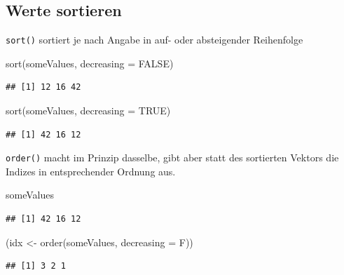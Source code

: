 \documentclass[
]{book}
\newenvironment{Shaded}{\begin{snugshade}}{\end{snugshade}}
\newcommand{\AttributeTok}[1]{\textcolor[rgb]{0.77,0.63,0.00}{#1}}
\newcommand{\ConstantTok}[1]{\textcolor[rgb]{0.00,0.00,0.00}{#1}}
\newcommand{\FunctionTok}[1]{\textcolor[rgb]{0.00,0.00,0.00}{#1}}
\newcommand{\NormalTok}[1]{#1}
\newcommand{\OtherTok}[1]{\textcolor[rgb]{0.56,0.35,0.01}{#1}}
\begin{document}
\hypertarget{werte-sortieren}{%
\subsection{Werte sortieren}\label{werte-sortieren}}

\texttt{sort()} sortiert je nach Angabe in auf- oder absteigender Reihenfolge

\begin{Shaded}
\begin{Highlighting}[]
\FunctionTok{sort}\NormalTok{(someValues, }\AttributeTok{decreasing =} \ConstantTok{FALSE}\NormalTok{)}
\end{Highlighting}
\end{Shaded}

\begin{verbatim}
## [1] 12 16 42
\end{verbatim}

\begin{Shaded}
\begin{Highlighting}[]
\FunctionTok{sort}\NormalTok{(someValues, }\AttributeTok{decreasing =} \ConstantTok{TRUE}\NormalTok{)}
\end{Highlighting}
\end{Shaded}

\begin{verbatim}
## [1] 42 16 12
\end{verbatim}

\texttt{order()} macht im Prinzip dasselbe, gibt aber statt des sortierten Vektors die Indizes in entsprechender Ordnung aus.

\begin{Shaded}
\begin{Highlighting}[]
\NormalTok{someValues}
\end{Highlighting}
\end{Shaded}

\begin{verbatim}
## [1] 42 16 12
\end{verbatim}

\begin{Shaded}
\begin{Highlighting}[]
\NormalTok{(idx }\OtherTok{\textless{}{-}} \FunctionTok{order}\NormalTok{(someValues, }\AttributeTok{decreasing =}\NormalTok{ F))}
\end{Highlighting}
\end{Shaded}

\begin{verbatim}
## [1] 3 2 1
\end{verbatim}
\end{document}
